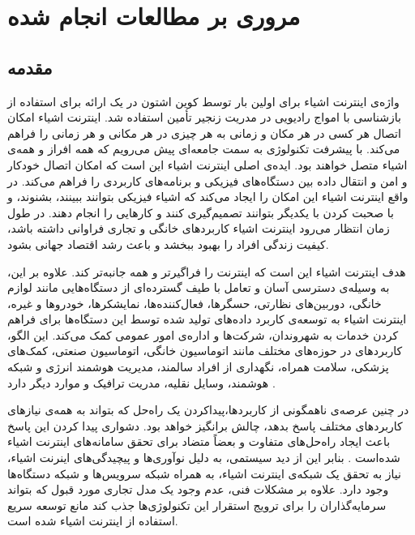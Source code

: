 \chapter{مروری بر مطالعات انجام شده}\label{chap:literature_review}
  \thispagestyle{empty}
  \section{مقدمه}
    واژه‌ی اینترنت اشیاء برای اولین بار توسط کوین اشتون در یک ارائه برای استفاده از بازشناسی با امواج رادیویی در مدریت زنجیر تأمین استفاده شد\cite{shton2009that}.
    اینترنت اشیاء امکان اتصال هر کسی در هر مکان و زمانی به هر چیزی در هر مکانی و هر زمانی را فراهم می‌کند.
    با پیشرفت تکنولوژی به سمت جامعه‌ای پیش می‌رویم که همه افراز و همه‌ی اشیاء متصل خواهند بود\cite{zheng2011internet}.
    ایده‌ی اصلی اینترنت اشیاء این است که امکان اتصال خودکار و امن و انتقال داده‌ بین دستگاه‌های فیزیکی و برنامه‌های کاربردی را فراهم می‌کند.
    در واقع اینترنت اشیاء این امکان را ایجاد می‌کند که اشیاء فیزیکی بتوانند ببینند، بشنوند، و با صحبت کردن با یکدیگر بتوانند تصمیم‌گیری کنند و کار‌هایی را انجام دهند\cite{al2015internet}.
    در طول زمان انتظار می‌رود اینترنت اشیاء کاربرد‌های خانگی و تجاری فراوانی داشته باشد، کیفیت زندگی افراد را بهبود ببخشد و باعث رشد اقتصاد جهانی بشود.

    هدف اینترنت اشیاء این است که اینترنت را فراگیرتر و همه جانبه‌تر کند.
    علاوه بر این، به وسیله‌ی دسترسی آسان و تعامل با طیف گسترده‌ای از دستگاه‌هایی مانند لوازم خانگی، دوربین‌های نظارتی، حسگر‌ها، فعال‌کننده‌ها، نمایشکر‌ها، خودرو‌ها و غیره، اینترنت اشیاء به توسعه‌ی کاربرد داده‌های تولید شده توسط این دستگاه‌ها برای فراهم کردن خدمات به شهروندان، شرکت‌ها و اداره‌ی امور عمومی کمک می‌کند.
    این الگو، کاربرد‌های در حوزه‌های مختلف مانند اتوماسیون خانگی، اتوماسیون صنعتی، کمک‌های پزشکی، سلامت همراه، نگهداری از افراد سالمند، مدیریت هوشمند انرژی و شبکه هوشمند، وسایل نقلیه، مدریت ترافیک و موارد دیگر دارد \cite{bellavista2013convergence}.

    در چنین عرصه‌ی ناهمگونی از کاربرد‌ها،پیداکردن یک راه‌حل که بتواند به همه‌ی نیاز‌های کاربرد‌های مختلف پاسخ بدهد، چالش برانگیز خواهد بود.
    دشواری پیدا کردن این پاسخ باعث ایجاد راه‌حل‌های متفاوت و بعضاً متضاد برای تحقق سامانه‌های اینترنت اشیاء شده‌است \cite{zanella2014internet}.
    بنابر این از دید سیستمی، به دلیل نوآوری‌ها و پیچیدگی‌های اینرنت اشیاء، نیاز به تحقق یک شبکه‌ی اینترنت اشیاء، به همراه شبکه سرویس‌ها و شبکه دستگاه‌ها وجود دارد.
    علاوه بر مشکلات فنی، عدم وجود یک مدل تجاری مورد قبول که بتواند سرمایه‌گذاران را برای ترویج استقرار این تکنولوژی‌ها جذب کند مانع توسعه سریع استفاده از اینترنت اشیاء شده است\cite{laya2013investing}.

